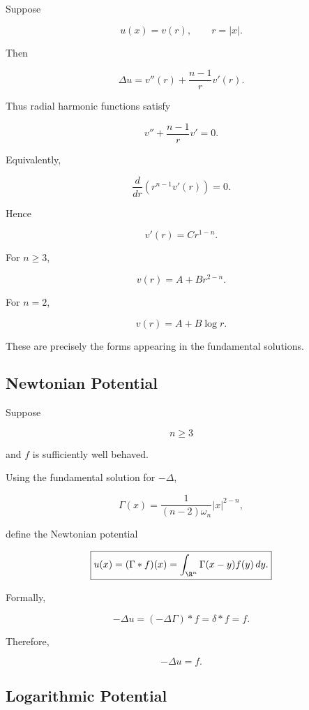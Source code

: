 Suppose

\[
u(x)=v(r),
\qquad
r=|x|.
\]

Then

\[
\boxed{
\Delta u
=
v''(r)
+
\frac{n-1}{r}v'(r).
}
\]

Thus radial harmonic functions satisfy

\[
v''
+
\frac{n-1}{r}v'
=
0.
\]

Equivalently,

\[
\frac{d}{dr}
\left(
r^{n-1}v'(r)
\right)
=
0.
\]

Hence

\[
v'(r)
=
Cr^{1-n}.
\]

For \(n\geq3\),

\[
\boxed{
v(r)
=
A+Br^{2-n}.
}
\]

For \(n=2\),

\[
\boxed{
v(r)
=
A+B\log r.
}
\]

These are precisely the forms appearing in the fundamental solutions.

\subsection{Newtonian Potential}
\label{subsec:newtonian-potential}

Suppose

\[
n\geq3
\]

and \(f\) is sufficiently well behaved.

Using the fundamental solution for \(-\Delta\),

\[
\Gamma(x)
=
\frac{1}{(n-2)\omega_n}|x|^{2-n},
\]

define the Newtonian potential

\[
\boxed{
u(x)
=
(\Gamma*f)(x)
=
\int_{\R^n}
\Gamma(x-y)f(y)\,dy.
}
\]

Formally,

\[
-\Delta u
=
(-\Delta\Gamma)*f
=
\delta*f
=
f.
\]

Therefore,

\[
\boxed{
-\Delta u=f.
}
\]

\subsection{Logarithmic Potential}
\label{subsec:logarithmic-potential}

